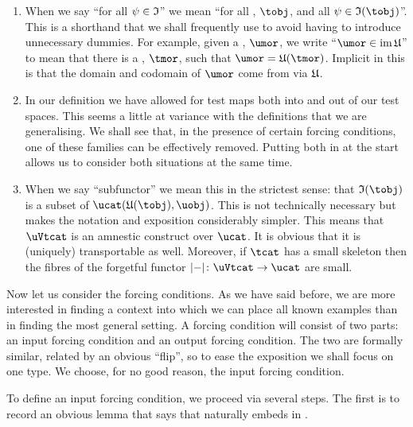 \documentclass[%
a4paper,%
arxiv,%
defaults
]{myclass}
\begin{document}
\begin{remark}
\label{rk:presmth}
\begin{enumerate}
\item When we say ``for all \(\ifn \in \itest\)'' we mean ``for all \tobjs, \(\tobj\), and all \(\ifn \in \itest(\tobj)\)''.
This is a shorthand that we shall frequently use to avoid having to introduce unnecessary dummies.
For example, given a \umor, \(\umor\), we write ``\(\umor \in \im \ufunc\)'' to mean that there is a \tmor, \(\tmor\), such that \(\umor = \ufunc(\tmor)\).
Implicit in this is that the domain and codomain of \(\umor\) come from \tobjs via \(\ufunc\).

\item In our definition we have allowed for test maps both into and out of our test spaces.
This seems a little at variance with the definitions that we are generalising.
We shall see that, in the presence of certain forcing conditions, one of these families can be effectively removed.
Putting both in at the start allows us to consider both situations at the same time.

\item
\label{it:sub}
When we say ``subfunctor'' we mean this in the strictest sense: that \(\itest(\tobj)\) is a subset of \(\Hom{\ucat}{\ufunc(\tobj)}{\uobj}\).
This is not technically necessary but makes the notation and exposition considerably simpler.
This means that \(\uVtcat\) is an amnestic construct over \(\ucat\).
It is obvious that it is (uniquely) transportable as well.
Moreover, if \(\tcat\) has a small skeleton then the fibres of the forgetful functor \(\forfunc \colon \uVtcat \to \ucat\) are small.
\end{enumerate}
\end{remark}

Now let us consider the forcing conditions.
As we have said before, we are more interested in finding a context into which we can place all known examples than in finding the most general setting.
A forcing condition will consist of two parts: an input forcing condition and an output forcing condition.
The two are formally similar, related by an obvious ``flip'', so to ease the exposition we shall focus on one type.
We choose, for no good reason, the input forcing condition.

To define an input forcing condition, we proceed via several steps.
The first is to record an obvious lemma that says that \tcat naturally embeds in \uVtcat.
\end{document}
